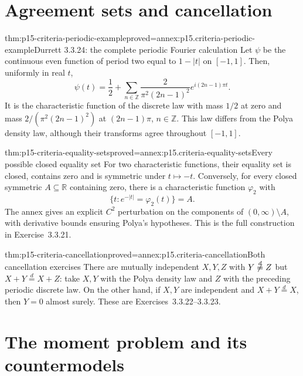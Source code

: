 \section{Agreement sets and cancellation}
\label{sec:p15-criteria-agreement}

\begin{hbtheorem}{thm:p15-criteria-periodic-example}{proved=annex:p15.criteria-periodic-example}{Durrett 3.3.24: the complete periodic Fourier calculation}
Let \(\psi\) be the continuous even function of period two
equal to \(1-|t|\) on \([-1,1]\). Then, uniformly in real \(t\),
\[
 \psi(t)=\frac12+
   \sum_{n\in\mathbb Z}
     \frac{2}{\pi^2(2n-1)^2}e^{i(2n-1)\pi t}.
\]
It is the characteristic function of the discrete law with
mass \(1/2\) at zero and mass
\(2/(\pi^2(2n-1)^2)\) at \((2n-1)\pi\), \(n\in\mathbb Z\).
This law differs from the Polya density law, although their
transforms agree throughout \([-1,1]\).
\end{hbtheorem}

\begin{hbtheorem}{thm:p15-criteria-equality-sets}{proved=annex:p15.criteria-equality-sets}{Every possible closed equality set}
For two characteristic functions, their equality set is
closed, contains zero and is symmetric under \(t\mapsto-t\).
Conversely, for every closed symmetric \(A\subseteq\mathbb R\)
containing zero, there is a characteristic function
\(\varphi_2\) with
\[
 \{t:e^{-|t|}=\varphi_2(t)\}=A.
\]
The annex gives an explicit \(C^2\) perturbation on the
components of \((0,\infty)\setminus A\), with derivative
bounds ensuring Polya's hypotheses.
This is the full construction in Exercise~3.3.21.
\end{hbtheorem}

\begin{hbtheorem}{thm:p15-criteria-cancellation}{proved=annex:p15.criteria-cancellation}{Both cancellation exercises}
There are mutually independent \(X,Y,Z\) with
\(Y\not\stackrel d=Z\) but \(X+Y\stackrel d=X+Z\):
take \(X,Y\) with the Polya density law and \(Z\) with the
preceding periodic discrete law.
On the other hand, if \(X,Y\) are independent and
\(X+Y\stackrel d=X\), then \(Y=0\) almost surely.
These are Exercises~3.3.22--3.3.23.
\end{hbtheorem}

\section{The moment problem and its countermodels}
\label{sec:p15-criteria-moment-problem}

